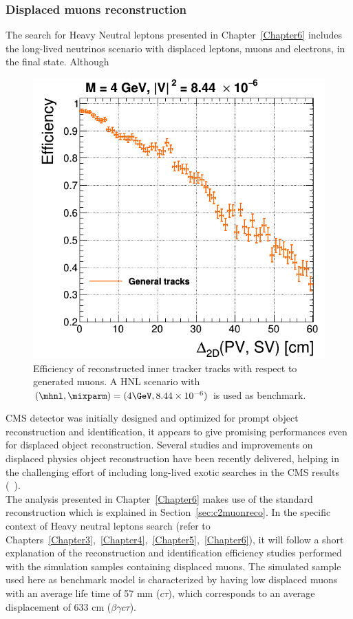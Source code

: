 \clearpage
\subsubsection{Displaced muons
  reconstruction}\label{sec:c2muondisplaced}
The search for Heavy Neutral leptons presented in
Chapter~\ref{Chapter6} includes the long-lived neutrinos scenario with
displaced leptons, muons and electrons, in the final
state. Although
\begin{figure}
\includegraphics[width=.40\textwidth]{Figures/c6/object/tracking_M-4_V-0p00290516780927_rho.png}
  \caption{Efficiency of reconstructed inner tracker tracks with
    respect to generated muons. A HNL scenario with
    $(\mhnl,\mixparm)=(4\GeV,8.44\times10^{-6})$ is used as
    benchmark. \dani}
  \label{fig:c2tracking}
\end{figure}
 CMS detector was initially designed and optimized for prompt
object reconstruction and identification, it appears to give
promising performances even for displaced object
reconstruction. Several studies and improvements on displaced physics object
reconstruction have been recently
delivered, helping in the challenging effort of including long-lived
exotic searches in the CMS results (~\cite{cmscollaboration2021search, Sirunyan_2019ll,
  Sirunyan_2019ll2, Sirunyan_2020ll, Sirunyan_2021ll,CMS:2021tkn}).\\

The analysis presented in Chapter~\ref{Chapter6} makes use of the
standard reconstruction which
 is explained in
Section~\ref{sec:c2muonreco}. In the specific context of Heavy
neutral leptons search (refer to
Chapters~\ref{Chapter3},~\ref{Chapter4},~\ref{Chapter5},~\ref{Chapter6}),
it will follow a short explanation of the reconstruction and
identification efficiency studies performed with the simulation
samples containing displaced muons. The simulated sample used here as
benchmark model is characterized by having low \pt displaced muons with an
average life time of 57 mm ($c\tau$), which corresponds to an average
displacement of 633 cm ($\beta \gamma c \tau$).

